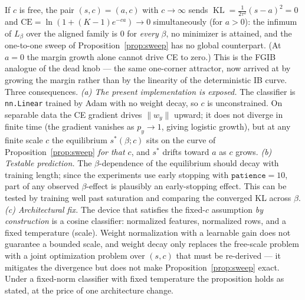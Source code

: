 \begin{remark}\label{rem:c-scale}
If $c$ is free, the pair $(s, c) = (a, c)$ with $c \to \infty$ sends
$\operatorname{KL} = \tfrac{1}{2\tau^2}(s-a)^2 = 0$ and
$\mathrm{CE} = \ln(1 + (K-1)e^{-ca}) \to 0$ simultaneously (for $a > 0$): the infimum
of $L_\beta$ over the aligned family is $0$ for \emph{every} $\beta$, no minimizer is
attained, and the one-to-one sweep of Proposition~\ref{prop:sweep} has no global
counterpart. (At $a = 0$ the margin growth alone cannot drive CE to zero.) This is
the FGIB analogue of the dead knob --- the same one-corner attractor, now arrived at by
growing the margin rather than by the linearity of the deterministic IB curve.
Three consequences.
\emph{(a) The present implementation is exposed.} The classifier is
\texttt{nn.Linear} trained by Adam with no weight decay, so $c$ is unconstrained. On
separable data the CE gradient drives $\|w_y\|$ upward; it does not diverge in finite
time (the gradient vanishes as $p_y \to 1$, giving logistic growth), but at any finite
scale $c$ the equilibrium $s^*(\beta; c)$ sits on the curve of
Proposition~\ref{prop:sweep} \emph{for that $c$}, and $s^*$ drifts toward $a$ as $c$
grows.
\emph{(b) Testable prediction.} The $\beta$-dependence of the equilibrium should decay
with training length; since the experiments use early stopping with $\texttt{patience} =
10$, part of any observed $\beta$-effect is plausibly an early-stopping effect. This can
be tested by training well past saturation and comparing the converged KL across
$\beta$.
\emph{(c) Architectural fix.} The device that satisfies the fixed-$c$ assumption
\emph{by construction} is a cosine classifier: normalized features, normalized rows,
and a fixed temperature (scale). Weight normalization with a learnable gain does not
guarantee a bounded scale, and weight decay only replaces the free-scale problem with a
joint optimization problem over $(s, c)$ that must be re-derived --- it mitigates the
divergence but does not make Proposition~\ref{prop:sweep} exact. Under a fixed-norm
classifier with fixed temperature the proposition holds as stated, at the price of one
architecture change.
\end{remark}

